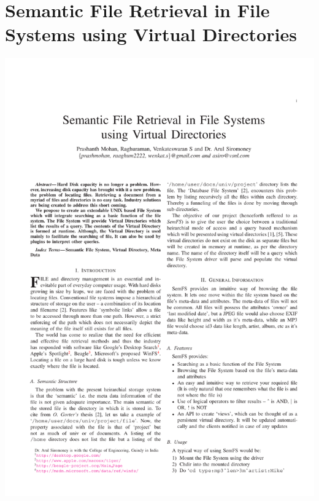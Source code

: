 \section{Semantic File Retrieval in File Systems using Virtual Directories}
\hspace*{-1.5cm}
\includegraphics[page=1,scale=0.75]{./appendix/VD.pdf}


